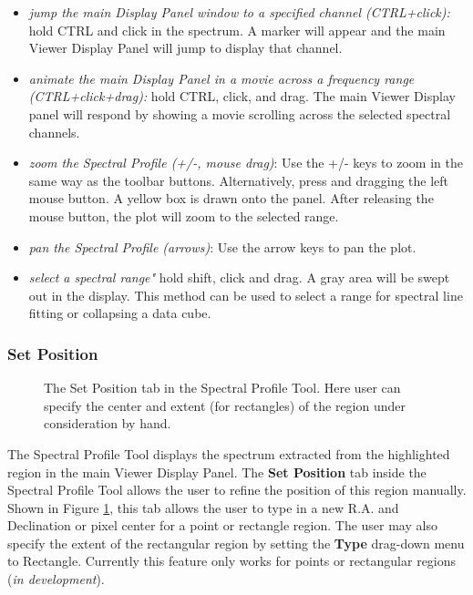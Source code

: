 \begin{itemize}
\item {\em jump the main Display Panel window to a specified channel (CTRL+click):} hold CTRL and click in the spectrum. A marker will appear and the
main Viewer Display Panel will jump to display that channel.
\item {\em animate the main Display Panel in a movie across a frequency range (CTRL+click+drag):} hold CTRL, click, and drag. The main Viewer Display
panel will respond by showing a movie scrolling across the selected spectral channels.
\item {\em zoom the Spectral Profile (+/-, mouse drag)}: Use the +/- keys to zoom in the same
way as the toolbar buttons. Alternatively, press and dragging the left mouse button. A yellow box is drawn onto the panel. After releasing the mouse button,
the plot will zoom to the selected range.
\item {\em pan the Spectral Profile (arrows)}: Use the arrow keys to pan the plot.
\item {\em select a spectral range"} hold shift, click and drag. A gray area will be swept out in the display. This method can be used to select a range
for spectral line fitting or collapsing a data cube.
\end{itemize}

\subsubsection{Set Position}
\label{section:display.image.specprof.setpos}

\begin{figure}[h!]
\begin{center}
\caption{\label{fig:viewer_setpos} The Set Position tab in the Spectral Profile Tool. Here user can specify the center and extent (for rectangles) of 
the region under consideration by hand.}
\hrulefill
\end{center}
\end{figure}

The Spectral Profile Tool displays the spectrum extracted from the
highlighted region in the main Viewer Display Panel. The {\bf Set
  Position} tab inside the Spectral Profile Tool allows the user to
refine the position of this region manually. Shown in Figure
\ref{fig:viewer_setpos}, this tab allows the user to type in a new
R.A. and Declination or pixel center for a point or rectangle
region. The user may also specify the extent of the rectangular region
by setting the {\bf Type} drag-down menu to Rectangle. Currently this
feature only works for points or rectangular regions ({\em in
  development}).

